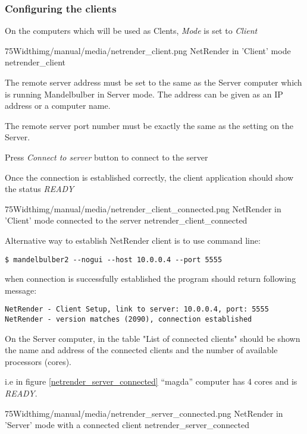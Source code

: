 \subsubsection{Configuring the clients}\label{configuring-the-clients}

On the computers which will be used as Clents, \emph{Mode} is set to
\emph{Client}

\simpleImageWithCaption75Width{img/manual/media/netrender_client.png}
{NetRender in 'Client' mode}
{netrender_client}

The remote server address must be set to the same as the Server computer which
is running Mandelbulber in Server mode. The address can be given as an IP
address or a computer name.

The remote server port number must be exactly the same as the setting on the
Server.

Press \emph{Connect to server} button to connect to the server

Once the connection is established correctly, the client application should show
the status \emph{READY}

\simpleImageWithCaption75Width{img/manual/media/netrender_client_connected.png}
{NetRender in 'Client' mode connected to the server}
{netrender_client_connected}

Alternative way to establish NetRender client is to use command line:

\begin{verbatim} 
$ mandelbulber2 --nogui --host 10.0.0.4 --port 5555
\end{verbatim}

when connection is successfully established the program should return following
message:

\begin{verbatim} 
NetRender - Client Setup, link to server: 10.0.0.4, port: 5555
NetRender - version matches (2090), connection established 
\end{verbatim}

On the Server computer, in the table "List of connected clients" should be shown
the name and address of the connected clients and the number of available
processors (cores).

i.e in figure \ref{netrender_server_connected} ``magda'' computer has 4 cores and is \emph{READY}.

\simpleImageWithCaption75Width{img/manual/media/netrender_server_connected.png}
{NetRender in 'Server' mode with a connected client}
{netrender_server_connected}

